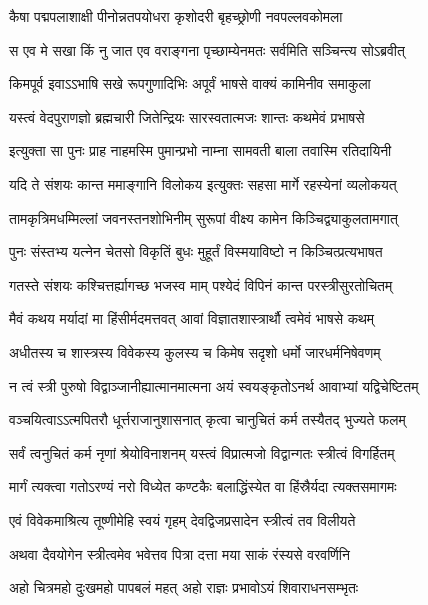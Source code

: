 \twolineshloka
{कैषा पद्मपलाशाक्षी पीनोन्नतपयोधरा}
{कृशोदरी बृहच्छ्रोणी नवपल्लवकोमला} %

\twolineshloka
{स एव मे सखा किं नु जात एव वराङ्गना}
{पृच्छाम्येनमतः सर्वमिति सञ्चिन्त्य सोऽब्रवीत्} %

\twolineshloka
{किमपूर्व इवाऽऽभाषि सखे रूपगुणादिभिः}
{अपूर्वं भाषसे वाक्यं कामिनीव समाकुला} %

\twolineshloka
{यस्त्वं वेदपुराणज्ञो ब्रह्मचारी जितेन्द्रियः}
{सारस्वतात्मजः शान्तः कथमेवं प्रभाषसे} %

\twolineshloka
{इत्युक्ता सा पुनः प्राह नाहमस्मि पुमान्प्रभो}
{नाम्ना सामवती बाला तवास्मि रतिदायिनी} %

\twolineshloka
{यदि ते संशयः कान्त ममाङ्गानि विलोकय}
{इत्युक्तः सहसा मार्गे रहस्येनां व्यलोकयत्} %

\twolineshloka
{तामकृत्रिमधम्मिल्लां जवनस्तनशोभिनीम्}
{सुरूपां वीक्ष्य कामेन किञ्चिद्व्याकुलतामगात्} %

\twolineshloka
{पुनः संस्तभ्य यत्नेन चेतसो विकृतिं बुधः}
{मुहूर्तं विस्मयाविष्टो न किञ्चित्प्रत्यभाषत} %

\twolineshloka
{गतस्ते संशयः कश्चित्तर्ह्यागच्छ भजस्व माम्}
{पश्येदं विपिनं कान्त परस्त्रीसुरतोचितम्} %

\twolineshloka
{मैवं कथय मर्यादां मा हिंसीर्मदमत्तवत्}
{आवां विज्ञातशास्त्रार्थौ त्वमेवं भाषसे कथम्} %

\twolineshloka
{अधीतस्य च शास्त्रस्य विवेकस्य कुलस्य च}
{किमेष सदृशो धर्मो जारधर्मनिषेवणम्} %

\twolineshloka
{न त्वं स्त्री पुरुषो विद्वाञ्जानीह्यात्मानमात्मना}
{अयं स्वयङ्कृतोऽनर्थ आवाभ्यां यद्विचेष्टितम्} %

\twolineshloka
{वञ्चयित्वाऽऽत्मपितरौ धूर्त्तराजानुशासनात्}
{कृत्वा चानुचितं कर्म तस्यैतद् भुज्यते फलम्} %

\twolineshloka
{सर्वं त्वनुचितं कर्म नृणां श्रेयोविनाशनम्}
{यस्त्वं विप्रात्मजो विद्वान्गतः स्त्रीत्वं विगर्हितम्} %

\twolineshloka
{मार्गं त्यक्त्वा गतोऽरण्यं नरो विध्येत कण्टकैः}
{बलाद्धिंस्येत वा हिंस्रैर्यदा त्यक्तसमागमः} %

\twolineshloka
{एवं विवेकमाश्रित्य तूष्णीमेहि स्वयं गृहम्}
{देवद्विजप्रसादेन स्त्रीत्वं तव विलीयते} %

\twolineshloka
{अथवा दैवयोगेन स्त्रीत्वमेव भवेत्तव}
{पित्रा दत्ता मया साकं रंस्यसे वरवर्णिनि} %

\twolineshloka
{अहो चित्रमहो दुःखमहो पापबलं महत्}
{अहो राज्ञः प्रभावोऽयं शिवाराधनसम्भृतः} %


